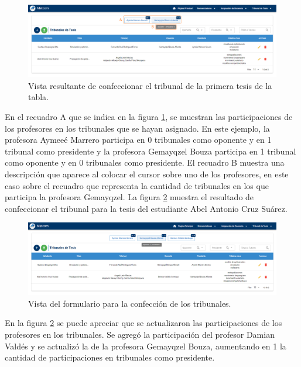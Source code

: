 \begin{figure}[H]
    \includegraphics[scale=0.3]{Graphics/Implementation/Tesis/thesis-committee-assign1.png}
    \caption{Vista resultante de confeccionar el tribunal de la primera tesis de la tabla.}
    \label{img-tc-thesis-committee-assign1}
\end{figure}

En el recuadro A que se indica en la figura \ref{img-tc-thesis-committee-assign1},
se muestran las participaciones de los profesores en los tribunales que se hayan asignado.
En este ejemplo, la profesora Aymeeé Marrero participa en 0 tribunales como oponente y en 1 tribunal
como presidente y la profesora Gemayqzel Bouza participa en 1 tribunal como oponente y en 0 tribunales 
como presidente.
El recuadro B muestra una descripción que aparece al colocar el cursor sobre uno de los profesores, en 
este caso sobre el recuadro que representa la cantidad de tribunales en los que participa la profesora Gemayqzel.
La figura \ref{img-tc-thesis-committee-assign2} muestra el resultado de confeccionar el tribunal para la tesis del estudiante Abel
Antonio Cruz Suárez.

\begin{figure}[H]
    \includegraphics[scale=0.3]{Graphics/Implementation/Tesis/thesis-committee-assign2.png}
    \caption{Vista del formulario para la confección de los tribunales.}
    \label{img-tc-thesis-committee-assign2}
\end{figure}

En la figura \ref{img-tc-thesis-committee-assign2}
se puede apreciar que se actualizaron las participaciones de los profesores en los tribunales.
Se agregó la participación del profesor Damian Valdés y se actualizó la de la profesora Gemayqzel Bouza, 
aumentando en 1 la cantidad de participaciones en tribunales como presidente.


